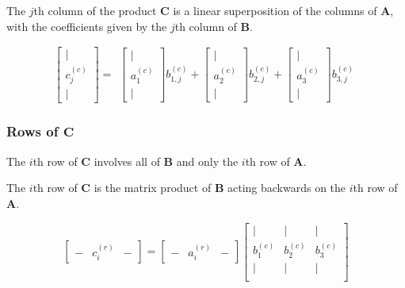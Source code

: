 The $j$th column of the product $\mathbf{C}$ is a linear superposition of the columns of $\mathbf{A}$, with the coefficients given by the $j$th column of $\mathbf{B}$.


\begin{equation}
\left[
\begin{array}{c}	
\vert\\
c^{(c)}_j\\
\vert
\end{array}
\right]=
\begin{array}{ccc}
\left[\begin{array}{c} \vert\\ a^{(c)}_1 \\ \vert \end{array}\right]b^{(c)}_{1,j} 
+ \left[\begin{array}{c} \vert\\ a^{(c)}_2 \\ \vert \end{array}\right]b^{(c)}_{2,j} 
+ \left[\begin{array}{c} \vert\\ a^{(c)}_3 \\ \vert \end{array}\right]b^{(c)}_{3,j} 
\end{array}
\end{equation}



\subsubsection{Rows of $\mathbf{C}$}
The $i$th row of $\mathbf{C}$ involves all of $\mathbf{B}$ and only the $i$th row of $\mathbf{A}$.

The $i$th row of $\mathbf{C}$ is the matrix product of $\mathbf{B}$ acting backwards on the $i$th row of $\mathbf{A}$.


\begin{equation}
\left[\begin{array}{ccc} - & c^{(r)}_i & - \end{array}\right] = 
\left[\begin{array}{ccc} - & a^{(r)}_i & - \end{array}\right] 
\left[
\begin{array}{ccc}
\vert & \vert & \vert \\
b^{(c)}_1 & b^{(c)}_2 & b^{(c)}_3\\
\vert & \vert & \vert \\
\end{array}
\right]
\end{equation}

